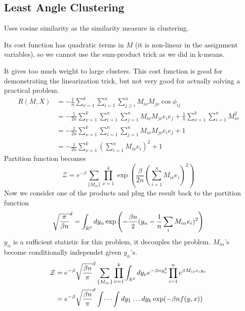 \documentclass[12pt]{article}
\begin{document}
\subsection{Least Angle Clustering}
\ulb
\item Uses cosine similarity as the similarity measure in clustering.
\item Its cost function has quadratic terms in $M$ (it is non-linear in the assignment variables), so we cannot use the sum-product trick as we did in k-means.
\item It gives too much weight to large clusters. This cost function is good for demonstrating the linearization trick, but not very good for actually solving a practical problem.
\ule
\begin{equation*}
\begin{split}
  R(M,X) &= -\frac{1}{n} \sum_{\nu = 1}^{k} \sum_{i = 1}^{n} \sum_{j \geq i}^{n} M_{i\nu} M_{j\nu} \cos\phi_{ij}
  \\
  &= -\frac{1}{2n} \sum_{\nu = 1}^{k} \sum_{i = 1}^{n} \sum_{j = 1}^{n} M_{i\nu} M_{j\nu} e_i e_j + \frac{1}{n} \sum_{\nu = 1}^{k} \sum_{i = 1}^{n} M_{i\nu}^2
  \\
  &= -\frac{1}{2n} \sum_{\nu = 1}^{k} \sum_{i = 1}^{n} \sum_{j = 1}^{n} M_{i\nu} M_{j\nu} e_i e_j + 1
  \\
  &= -\frac{1}{2n} \sum_{\nu = 1}^{k} (\sum_{i = 1}^{n} M_{i\nu} e_i)^2 + 1
\end{split}
\end{equation*}
Partition function becomes
\[ \mathcal{Z} = e^{-\beta} \sum_{\{M_{i\nu}\}} \prod_{\nu=1}^k \exp\left( \frac{\beta}{2n} (\sum_{i=1}^n M_{i\nu} e_{i})^2 \right) \]
Now we consider one of the products and plug the result back to the partition function
\[ \sqrt{\frac{\pi}{\beta n}}^d = \int_{\mathbb{R}^d} dy_{\alpha} \exp\left( -\frac{\beta n}{2} (y_{\alpha} - \frac{1}{n} \sum_i M_{i\alpha}e_i)^2 \right) \]
$y_{\alpha}$ is a sufficient statistic for this problem, it decouples the problem. $M_{i\alpha}$'s become conditionally independet given $y_{\alpha}$'s. 
\begin{equation*}
\begin{split}
\mathcal{Z} &= e^{-\beta} \sqrt{\frac{\beta n}{\pi}}^d \sum_{\{M_{i\nu}\}} \prod_{\nu=1}^k \int_{\mathbb{R}^d} dy_{\nu} e^{-\beta n y_{\nu}^2} \prod_{i=1}^n e^{\beta M_{i\nu}e_i y_{\nu}} \\
&= e^{-\beta} \sqrt{\frac{\beta n}{\pi}}^d \int\dots\int dy_1\dots dy_k \exp(-\beta n f(y,x))
\end{split}
\end{equation*}
\end{document}
